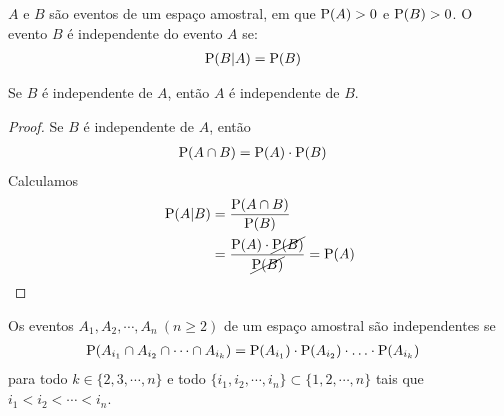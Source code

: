 \begin{definition}
    $A$ e $B$ são eventos de um espaço amostral, em que $\operatorname{P}(A) > 0$
    e $\operatorname{P}(B) > 0$. O evento $B$ é independente do evento $A$ se:
    \begin{align}
        \operatorname{P}(B | A) &= \operatorname{P}(B) \label{eq:ch01-independencia}
    \end{align}
\end{definition}

\begin{obs}
    Se $B$ é independente de $A$,
    então $A$ é independente de $B$.

    \begin{proof}
        Se $B$ é independente de $A$, então
        \begin{align*}
            \operatorname{P}(A \cap B) &= \operatorname{P}(A) \cdot \operatorname{P}(B)
        \end{align*}
        Calculamos
        \begin{align*}
            \operatorname{P}(A | B) &= \frac{\operatorname{P}(A \cap B)}{\operatorname{P}(B)}  \\
            &= \frac{\operatorname{P}(A) \cdot \cancel{\operatorname{P}(B)}}
                {\cancel{\operatorname{P}(B)}}
            = \operatorname{P}(A)
        \end{align*}
    \end{proof} 
\end{obs}

\begin{definition}
    Os eventos $A_1, A_2, \cdots, A_n\ (n \geq 2)$ de um espaço amostral
    são independentes se
    \begin{align*}
        \operatorname{P}(A_{i_1} \cap A_{i_2} \cap \cdots \cap A_{i_k})
        &= \operatorname{P}(A_{i_1}) \cdot \operatorname{P}(A_{i_2})
        \cdot \ldots \cdot \operatorname{P}(A_{i_k})
    \end{align*}
    para todo $k \in \{2, 3, \cdots, n\}$ e
    todo $\{i_1, i_2, \cdots, i_n\} \subset \{1, 2, \cdots, n\}$ tais que
    $i_1 < i_2 < \cdots < i_n$.
\end{definition}

